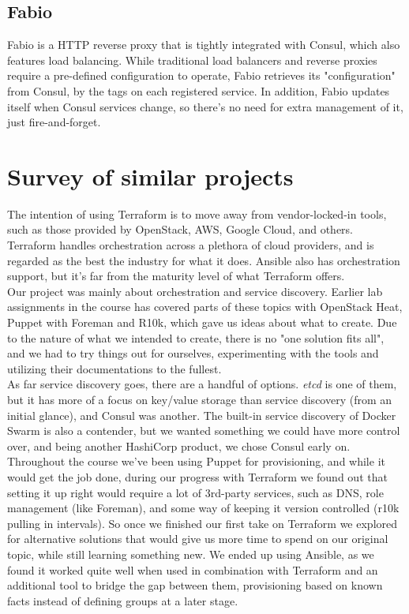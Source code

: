         \subsection{Fabio}
            Fabio is a HTTP reverse proxy that is tightly integrated with Consul, which also features load balancing. While traditional load balancers and reverse proxies require a pre-defined configuration to operate, Fabio retrieves its "configuration" from Consul, by the tags on each registered service. In addition, Fabio updates itself when Consul services change, so there's no need for extra management of it, just fire-and-forget.

    \section{Survey of similar projects}
        The intention of using Terraform is to move away from vendor-locked-in tools, such as those provided by OpenStack, AWS, Google Cloud, and others. Terraform handles orchestration across a plethora of cloud providers, and is regarded as the best the industry for what it does. Ansible also has orchestration support, but it's far from the maturity level of what Terraform offers.\\
        
        Our project was mainly about orchestration and service discovery. Earlier lab assignments in the course has covered parts of these topics with OpenStack Heat, Puppet with Foreman and R10k, which gave us ideas about what to create. Due to the nature of what we intended to create, there is no "one solution fits all", and we had to try things out for ourselves, experimenting with the tools and utilizing their documentations to the fullest.\\
        
        As far service discovery goes, there are a handful of options. \textit{etcd} is one of them, but it has more of a focus on key/value storage than service discovery (from an initial glance), and Consul was another. The built-in service discovery of Docker Swarm is also a contender, but we wanted something we could have more control over, and being another HashiCorp product, we chose Consul early on.\\
        
        Throughout the course we've been using Puppet for provisioning, and while it would get the job done, during our progress with Terraform we found out that setting it up right would require a lot of 3rd-party services, such as DNS, role management (like Foreman), and some way of keeping it version controlled (r10k pulling in intervals). So once we finished our first take on Terraform we explored for alternative solutions that would give us more time to spend on our original topic, while still learning something new. We ended up using Ansible, as we found it worked quite well when used in combination with Terraform and an additional tool to bridge the gap between them, provisioning based on known facts instead of defining groups at a later stage.\\
        
